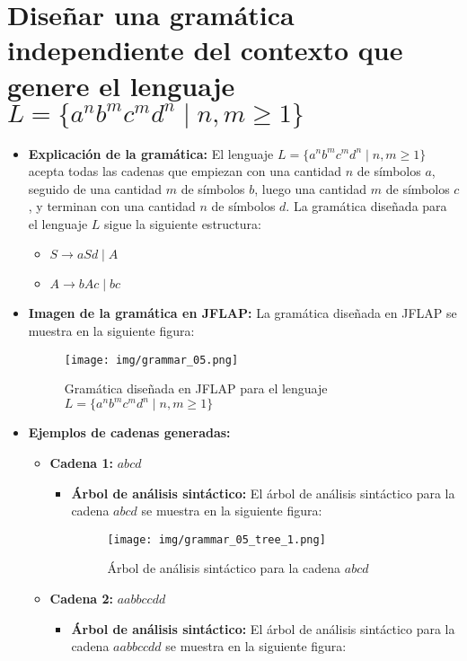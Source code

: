 \documentclass[11pt]{report}
\begin{document}
\section{Diseñar una gramática independiente del contexto que genere el lenguaje \texorpdfstring{$L = \{a^n b^m c^m d^n \mid n, m \geq 1\}$}{L = \{a^n b^m c^m d^n | n, m ≥ 1\}}}
\begin{itemize}
  \item \textbf{Explicación de la gramática:} El lenguaje $L = \{a^n b^m c^m d^n \mid n, m \geq 1\}$ acepta todas las cadenas que empiezan con una cantidad $n$ de símbolos $a$, seguido de una cantidad $m$ de símbolos $b$, luego una cantidad $m$ de símbolos $c$, y terminan con una cantidad $n$ de símbolos $d$. La gramática diseñada para el lenguaje $L$ sigue la siguiente estructura:
  \begin{itemize}
    \item $S \rightarrow aSd \mid A$
    \item $A \rightarrow bAc \mid bc$
  \end{itemize}
  \item \textbf{Imagen de la gramática en JFLAP:} La gramática diseñada en JFLAP se muestra en la siguiente figura:
  \begin{figure}[H]
    \centering
    \texttt{[image: img/grammar\_05.png]}
    \caption{Gramática diseñada en JFLAP para el lenguaje $L = \{a^n b^m c^m d^n \mid n, m \geq 1\}$}
  \end{figure}
  \item \textbf{Ejemplos de cadenas generadas:}
  \begin{itemize}
    \item \textbf{Cadena 1:} $abcd$
    \begin{itemize}
      \item \textbf{Árbol de análisis sintáctico:} El árbol de análisis sintáctico para la cadena $abcd$ se muestra en la siguiente figura:
      \begin{figure}[H]
        \centering
        \texttt{[image: img/grammar\_05\_tree\_1.png]}
        \caption{Árbol de análisis sintáctico para la cadena $abcd$}
        \label{fig:arbol13}
      \end{figure}
    \end{itemize}
    \item \textbf{Cadena 2:} $aabbccdd$
    \begin{itemize}
      \item \textbf{Árbol de análisis sintáctico:} El árbol de análisis sintáctico para la cadena $aabbccdd$ se muestra en la siguiente figura:

\end{itemize}
\end{itemize}
\end{itemize}
\end{document}
